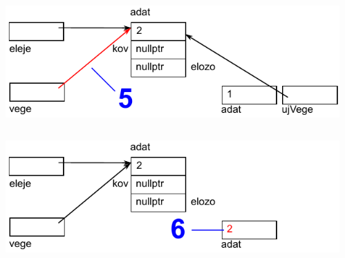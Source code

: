 \begin{frame}
  \begin{columns}[c]
      \scriptsize
      \begin{exampleblock}{}
        \scriptsize
        
      \end{exampleblock}
      \includegraphics[width=\textwidth]{sor/sor24.pdf}
  \end{columns}
\end{frame}

\begin{frame}
  \begin{columns}[c]
      \scriptsize
      \begin{exampleblock}{}
        \scriptsize
        
      \end{exampleblock}
      \includegraphics[width=\textwidth]{sor/sor25.pdf}
  \end{columns}
\end{frame}

